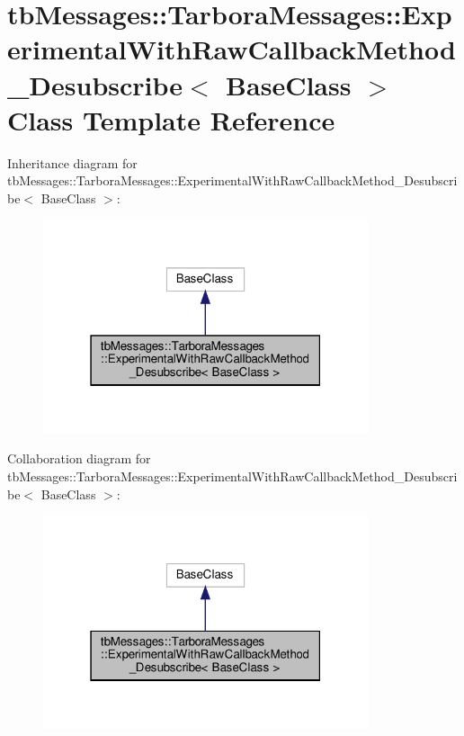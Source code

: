 \hypertarget{classtbMessages_1_1TarboraMessages_1_1ExperimentalWithRawCallbackMethod__Desubscribe}{}\section{tb\+Messages\+:\+:Tarbora\+Messages\+:\+:Experimental\+With\+Raw\+Callback\+Method\+\_\+\+Desubscribe$<$ Base\+Class $>$ Class Template Reference}
\label{classtbMessages_1_1TarboraMessages_1_1ExperimentalWithRawCallbackMethod__Desubscribe}


Inheritance diagram for tb\+Messages\+:\+:Tarbora\+Messages\+:\+:Experimental\+With\+Raw\+Callback\+Method\+\_\+\+Desubscribe$<$ Base\+Class $>$\+:
\nopagebreak
\begin{figure}[H]
\begin{center}
\leavevmode
\includegraphics[width=271pt]{classtbMessages_1_1TarboraMessages_1_1ExperimentalWithRawCallbackMethod__Desubscribe__inherit__graph}
\end{center}
\end{figure}


Collaboration diagram for tb\+Messages\+:\+:Tarbora\+Messages\+:\+:Experimental\+With\+Raw\+Callback\+Method\+\_\+\+Desubscribe$<$ Base\+Class $>$\+:
\nopagebreak
\begin{figure}[H]
\begin{center}
\leavevmode
\includegraphics[width=271pt]{classtbMessages_1_1TarboraMessages_1_1ExperimentalWithRawCallbackMethod__Desubscribe__coll__graph}
\end{center}
\end{figure}
